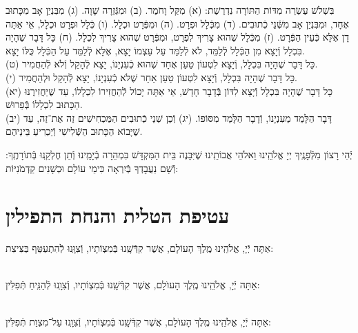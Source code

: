 \documentclass[twoside, openany, parskip=half, 11pt]{book}
\begin{document}
בִּשְׁלֹשׁ עֶשְׂרֵה מִדּוֹת הַתּוֹרָה נִדְרֶשֶׁת:\hfill \break
(א) מִקַּל וָחֹמֶר.\hfill \break
(ב) וּמִגְּֿזֵרָה שָׁוָה.\hfill \break
(ג) מִבִּנְיַן אָב מִכָּתוּב אֶחָד, וּמִבִּנְיַן אָב מִשְּֿׁנֵי כְֿתוּבִים.\hfill \break
(ד) מִכְּֿלָל וּפְרָט.\hfill \break
(ה) וּמִפְּֿרָט וּכְלָל.\hfill \break
(ו) כְּֿלָל וּפְרָט וּכְלָל, אֵי אַתָּה דָן אֶלָּא כְּֿעֵין הַפְּֿרָט.\hfill \break
(ז) מִכְּֿלָל שֶׁהוּא צָרִיךְ לִפְרָט, וּמִפְּֿרָט שֶׁהוּא צָרִיךְ לִכְלָל.\hfill \break
(ח) כָּל דָּבָר שֶׁהָיָה בִּכְלָל וְֿיָצָא מִן הַכְּֿלָל לְֿלַמֵּד, לֹא לְֿלַמֵּד עַל עַצְמוֹ יָצָא, אֶלָּא לְֿלַמֵּד עַל הַכְּֿלָל כֻּלּוֹ יָצָא. \\
(ט) כָּל דָּבָר שֶׁהָיָה בִּכְלָל, וְֿיָצָא לִטְעוֹן טַעַן אֶחָד שֶׁהוּא כְֿעִנְיָנוֹ, יָצָא לְֿהָקֵל וְֿלֹא לְֿהַחֲמִיר. \\
(י) כָּל דָּבָר שֶׁהָיָה בִּכְלָל, וְֿיָצָא לִטְעוֹן טַעַן אַחֵר שֶׁלֹּא כְֿעִנְיָנוֹ, יָצָא לְֿהָקֵל וּלְהַחֲמִיר. \\
(יא) כָּל דָּבָר שֶׁהָיָה בִּכְלָל וְֿיָצָא לִדּוֹן בְּֿדָבָר חָדָשׁ, אֵי אַתָּה יָכוֹל לְֿהַחֲזִירוֹ לִכְלָלוֹ, עַד שֶׁיַּחֲזִירֶנּוּ הַכָּתוּב לִכְלָלוֹ בְּֿפֵרוּשׁ. \\
(יב) דָּבָר הַלָּמֵד מֵעִנְיָנוֹ, וְֿדָבָר הַלָּמֵד מִסּוֹפוֹ.\hfill \break
(יג) וְֿכֵן שְׁנֵי כְֿתוּבִים הַמַּכְחִישִׁים זֶה אֶת־זֶה, עַד שֶׁיָּבוֹא הַכָּתוּב הַשְּֿׁלִישִׁי וְֿיַכְרִיעַ בֵּינֵיהֶם.

יְֿהִי רָצוֹן מִלְּֿפָנֶֽיךָ יְיָ אֱלֹהֵֽינוּ וֵאלֹהֵי אֲבוֹתֵֽינוּ שֶׁיִּבָּנֶה בֵּית הַמִּקְדָּשׁ בִּמְהֵרָה בְֿיָמֵֽינוּ וְֿתֵן חֶלְקֵֽנוּ בְּֿתוֹרָתֶֽךָ: וְֿשָׁם נַעֲבׇדְךָ בְּֿיִרְאָה כִּימֵי עוֹלָם וּכְשָׁנִים קַדְמֹנִיּוֹת:

\clearpage

\section[עטיפת הטלית והנחת התפילין]{ עטיפת הטלית והנחת התפילין }

אַתָּה יְֿיָ, אֱלֹהֵֽינוּ מֶֽלֶךְ הָעוֹלָם, אֲשֶׁר קִדְּֿשָֽׁנוּ בְּֿמִצְוֹתָיו, וְֿצִוָּֽנוּ לְֿהִתְעַטֵּף בַּצִּיצִת:


\sepline

\\
אַתָּה יְֿיָ, אֱלֹהֵֽינוּ מֶֽלֶךְ הָעוֺלָם, אֲשֶׁר קִדְּֿשָֽׁנוּ בְּֿמִצְוֹתָיו, וְֿצִוָֽנוּ לְֿהַנִּֽיחַ תְּֿפִלִּין:

\\
אַתָּה יְֿיָ, אֱלֹהֵֽינוּ מֶֽלֶךְ הָעוֺלָם, אֲשֶׁר קִדְּֿשָֽׁנוּ בְּֿמִצְוֹתָיו, וְֿצִוָֽנוּ עַל־מִצְוַת תְּֿפִלִּין:
\end{document}
